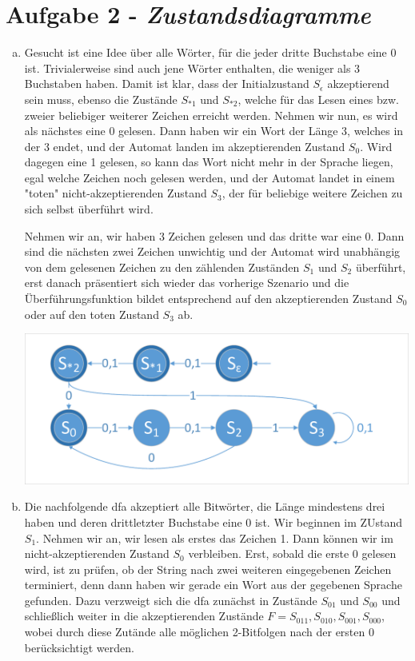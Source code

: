 \documentclass{article}
\begin{document}
	\section*{Aufgabe 2 - \textit{Zustandsdiagramme}}
	\begin{enumerate}[a)]
		\item Gesucht ist eine Idee über alle Wörter, für die jeder dritte Buchstabe eine 0 ist. Trivialerweise sind auch jene Wörter enthalten, die weniger als 3 Buchstaben haben. Damit ist klar, dass der Initialzustand $S_\epsilon$ akzeptierend sein muss, ebenso die Zustände $S_{*1}$ und $S_{*2}$, welche für das Lesen eines bzw. zweier beliebiger weiterer Zeichen erreicht werden. Nehmen wir nun, es wird als nächstes eine 0 gelesen. Dann haben wir ein Wort der Länge 3, welches in der 3 endet, und der Automat landen im akzeptierenden Zustand $S_0$. Wird dagegen eine 1 gelesen, so kann das Wort nicht mehr in der Sprache liegen, egal welche Zeichen noch gelesen werden, und der Automat landet in einem "toten" nicht-akzeptierenden Zustand $S_3$, der für beliebige weitere Zeichen zu sich selbst überführt wird.
		
		Nehmen wir an, wir haben 3 Zeichen gelesen und das dritte war eine 0. Dann sind die nächsten zwei Zeichen unwichtig und der Automat wird unabhängig von dem gelesenen Zeichen zu den zählenden Zuständen $S_1$ und $S_2$ überführt, erst danach präsentiert sich wieder das vorherige Szenario und die Überführungsfunktion bildet entsprechend auf den akzeptierenden Zustand $S_0$ oder auf den toten Zustand $S_3$ ab.
		
		\includegraphics[width=\textwidth]{dfa1.pdf}
		\item Die nachfolgende dfa akzeptiert alle Bitwörter, die Länge mindestens drei haben und deren drittletzter Buchstabe eine 0 ist. Wir beginnen im ZUstand $S_1$. Nehmen wir an, wir lesen als erstes das Zeichen 1. Dann können wir im nicht-akzeptierenden Zustand $S_0$ verbleiben. Erst, sobald die erste 0 gelesen wird, ist zu prüfen, ob der String nach zwei weiteren eingegebenen Zeichen terminiert, denn dann haben wir gerade ein Wort aus der gegebenen Sprache gefunden. Dazu verzweigt sich die dfa zunächst in Zustände $S_{01}$ und $S_{00}$ und schließlich weiter in die akzeptierenden Zustände $F = S_{011}, S_{010}, S_{001}, S_{000}$, wobei durch diese Zutände alle möglichen 2-Bitfolgen nach der ersten 0 berücksichtigt werden.
		

\end{enumerate}
\end{document}
